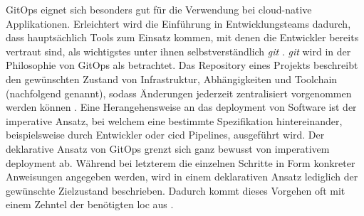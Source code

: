 GitOps eignet sich besonders gut für die Verwendung bei \gls{cloud-native} Applikationen. Erleichtert wird die Einführung in Entwicklungsteams dadurch, dass hauptsächlich Tools zum Einsatz kommen, mit denen die Entwickler bereits vertraut sind, als wichtigstes unter ihnen selbstverständlich \textit{\Gls{git}} \cite{109:GitOps}. \textit{\Gls{git}} wird in der Philosophie von GitOps als  betrachtet. Das Repository eines Projekts beschreibt den gewünschten Zustand von Infrastruktur, Abhängigkeiten und Toolchain (nachfolgend  genannt), sodass Änderungen jederzeit zentralisiert vorgenommen werden können \cite{007:Analysis-of-Declarative-and-Pull-based-Deployment-Models-on-GitOps,010:Efficient-Application-Deployment-GitOps-for-Faster-and-Secure-CI-CD-Cycles,109:GitOps}. Eine Herangehensweise an das \Gls{deployment} von Software ist der imperative Ansatz, bei welchem eine bestimmte Spezifikation hintereinander, beispielsweise durch Entwickler oder \Gls{cicd} Pipelines, ausgeführt wird. Der deklarative Ansatz von GitOps grenzt sich ganz bewusst von imperativem \Gls{deployment} ab. Während bei letzterem die einzelnen Schritte in Form konkreter Anweisungen angegeben werden, wird in einem deklarativen Ansatz lediglich der gewünschte Zielzustand beschrieben. Dadurch kommt dieses Vorgehen oft mit einem Zehntel der benötigten \Gls{loc} aus \cite{007:Analysis-of-Declarative-and-Pull-based-Deployment-Models-on-GitOps}.

